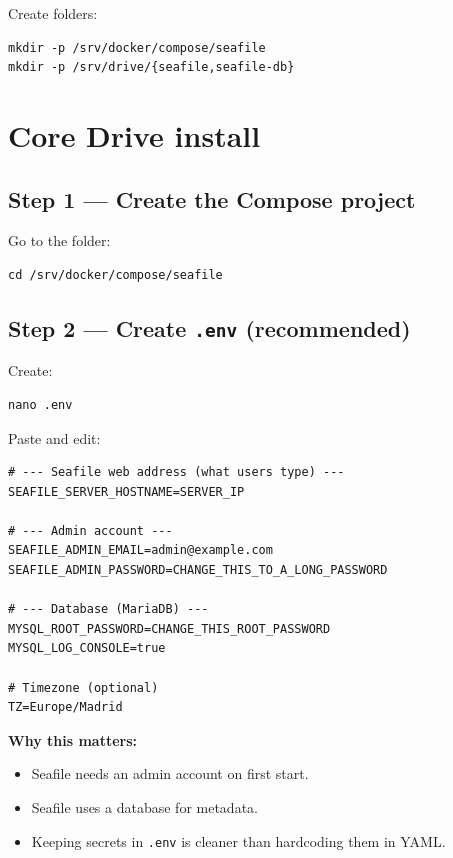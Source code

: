Create folders:

\begin{lstlisting}
mkdir -p /srv/docker/compose/seafile
mkdir -p /srv/drive/{seafile,seafile-db}
\end{lstlisting}

\section{Core Drive install}
\subsection{Step 1 --- Create the Compose project}
Go to the folder:

\begin{lstlisting}
cd /srv/docker/compose/seafile
\end{lstlisting}

\subsection{Step 2 --- Create \texttt{.env} (recommended)}
Create:

\begin{lstlisting}
nano .env
\end{lstlisting}

Paste and edit:

\begin{lstlisting}
# --- Seafile web address (what users type) ---
SEAFILE_SERVER_HOSTNAME=SERVER_IP

# --- Admin account ---
SEAFILE_ADMIN_EMAIL=admin@example.com
SEAFILE_ADMIN_PASSWORD=CHANGE_THIS_TO_A_LONG_PASSWORD

# --- Database (MariaDB) ---
MYSQL_ROOT_PASSWORD=CHANGE_THIS_ROOT_PASSWORD
MYSQL_LOG_CONSOLE=true

# Timezone (optional)
TZ=Europe/Madrid
\end{lstlisting}

\textbf{Why this matters:}
\begin{itemize}[leftmargin=*]
  \item Seafile needs an admin account on first start.
  \item Seafile uses a database for metadata.
  \item Keeping secrets in \texttt{.env} is cleaner than hardcoding them in YAML.
\end{itemize}


